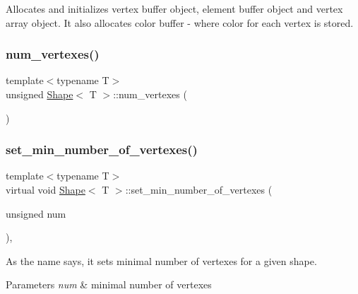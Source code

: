 Allocates and initializes vertex buffer object, element buffer object and vertex array object. It also allocates color buffer -\/ where color for each vertex is stored. 

\mbox{\label{classShape_a131e85c7f5cad85bffb92e6719117cab}} 
\subsubsection{\texorpdfstring{num\+\_\+vertexes()}{num\_vertexes()}}
{\footnotesize\ttfamily template$<$typename T$>$ \\
unsigned \mbox{\hyperlink{classShape}{Shape}}$<$ T $>$\+::num\+\_\+vertexes (\begin{DoxyParamCaption}{ }\end{DoxyParamCaption})\hspace{0.3cm}{\ttfamily [inline]}}

\mbox{\label{classShape_ac5a35fe1b2ecb8fcfc050a31c8969805}} 
\subsubsection{\texorpdfstring{set\+\_\+min\+\_\+number\+\_\+of\+\_\+vertexes()}{set\_min\_number\_of\_vertexes()}}
{\footnotesize\ttfamily template$<$typename T$>$ \\
virtual void \mbox{\hyperlink{classShape}{Shape}}$<$ T $>$\+::set\+\_\+min\+\_\+number\+\_\+of\+\_\+vertexes (\begin{DoxyParamCaption}\item[{unsigned}]{num }\end{DoxyParamCaption})\hspace{0.3cm}{\ttfamily [inline]}, {\ttfamily [virtual]}}



As the name says, it sets minimal number of vertexes for a given shape. 


\begin{DoxyParams}{Parameters}
{\em num} & minimal number of vertexes \\
\hline
\end{DoxyParams}
\mbox{\label{classShape_a69dabd50440dba1ac463ad6819cdb506}} 
